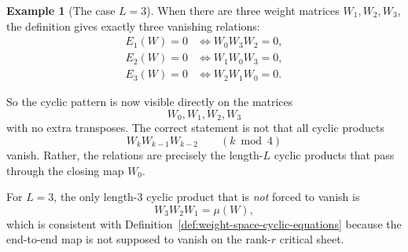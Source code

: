 \documentclass{article}
\theoremstyle{definition}
\newtheorem{example}[theorem]{Example}
\begin{document}
\begin{example}[The case $L=3$]
When there are three weight matrices $W_1,W_2,W_3$, the definition gives exactly three vanishing relations:
\begin{align*}
E_1(W)=0 &\iff W_0W_3W_2 = 0, \\
E_2(W)=0 &\iff W_1W_0W_3 = 0, \\
E_3(W)=0 &\iff W_2W_1W_0 = 0.
\end{align*}

So the cyclic pattern is now visible directly on the matrices
\[
W_0,W_1,W_2,W_3
\]
with no extra transposes. The correct statement is not that all cyclic products
\[
W_kW_{k-1}W_{k-2}
\qquad (k \bmod 4)
\]
vanish. Rather, the relations are precisely the length-$L$ cyclic products that pass through the closing map $W_0$.

For $L=3$, the only length-$3$ cyclic product that is \emph{not} forced to vanish is
\[
W_3W_2W_1
=
\mu(W),
\]
which is consistent with Definition~\ref{def:weight-space-cyclic-equations} because the end-to-end map is not supposed to vanish on the rank-$r$ critical sheet.
\end{example}
\end{document}
